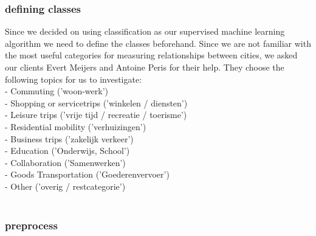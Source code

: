 \subsubsection{defining classes}
Since we decided on using classification as our supervised machine learning algorithm we need to define the classes beforehand. Since we are not familiar with the most useful categories for measuring relationships between cities, we asked our clients Evert Meijers and Antoine Peris for their help. They choose the following topics for us to investigate:\\
- Commuting ('woon-werk') \\
- Shopping or servicetrips ('winkelen / diensten') \\
- Leisure trips ('vrije tijd / recreatie / toerisme') \\
- Residential mobility ('verhuizingen') \\
- Business trips ('zakelijk verkeer') \\
- Education ('Onderwijs, School') \\
- Collaboration ('Samenwerken') \\
- Goods Transportation ('Goederenvervoer') \\
- Other ('overig / restcategorie') \\
\\


\subsubsection{preprocess}

